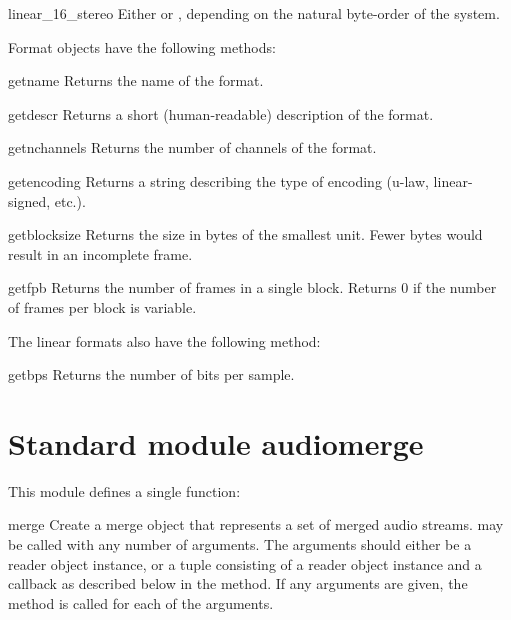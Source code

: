 \begin{datadesc}{linear_16_stereo}
Either  or ,
depending on the natural byte-order of the system.
\end{datadesc}

Format objects have the following methods:
\renewcommand{\indexsubitem}{(audioformat object methods)}

\begin{funcdesc}{getname}{}
Returns the name of the format.
\end{funcdesc}

\begin{funcdesc}{getdescr}{}
Returns a short (human-readable) description of the format.
\end{funcdesc}

\begin{funcdesc}{getnchannels}{}
Returns the number of channels of the format.
\end{funcdesc}

\begin{funcdesc}{getencoding}{}
Returns a string describing the type of encoding (u-law,
linear-signed, etc.).
\end{funcdesc}

\begin{funcdesc}{getblocksize}{}
Returns the size in bytes of the smallest unit.  Fewer bytes would
result in an incomplete frame.
\end{funcdesc}

\begin{funcdesc}{getfpb}{}
Returns the number of frames in a single block.  Returns 0 if the
number of frames per block is variable.
\end{funcdesc}

The linear formats also have the following method:

\begin{funcdesc}{getbps}{}
Returns the number of bits per sample.
\end{funcdesc}

\section{Standard module audiomerge}
\renewcommand{\indexsubitem}{(in module audiomerge)}

This module defines a single function:

\begin{funcdesc}{merge}{}
Create a merge object that represents a set of merged audio streams.
 may be called with any number of arguments.  The
arguments should either be a reader object instance, or a tuple
consisting of a reader object instance and a callback as described
below in the  method.  If any arguments are given, the
 method is called for each of the arguments.
\end{funcdesc}

